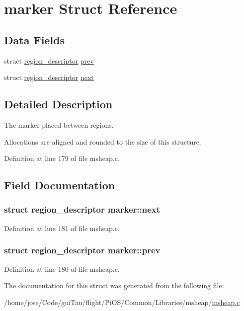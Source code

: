 \hypertarget{structmarker}{\section{marker Struct Reference}
\label{structmarker}
}
\subsection*{Data Fields}
\begin{DoxyCompactItemize}
\item 
struct \hyperlink{structregion__descriptor}{region\-\_\-descriptor} \hyperlink{structmarker_ade82c23737dc1d59fee5bbd897cfc5ed}{prev}
\item 
struct \hyperlink{structregion__descriptor}{region\-\_\-descriptor} \hyperlink{structmarker_a8a16cad707a0a821789eb685a6065b03}{next}
\end{DoxyCompactItemize}


\subsection{Detailed Description}
The marker placed between regions.

Allocations are aligned and rounded to the size of this structure. 

Definition at line 179 of file msheap.\-c.



\subsection{Field Documentation}
\hypertarget{structmarker_a8a16cad707a0a821789eb685a6065b03}{
\subsubsection[{next}]{\setlength{\rightskip}{0pt plus 5cm}struct {\bf region\-\_\-descriptor} marker\-::next}}\label{structmarker_a8a16cad707a0a821789eb685a6065b03}


Definition at line 181 of file msheap.\-c.

\hypertarget{structmarker_ade82c23737dc1d59fee5bbd897cfc5ed}{
\subsubsection[{prev}]{\setlength{\rightskip}{0pt plus 5cm}struct {\bf region\-\_\-descriptor} marker\-::prev}}\label{structmarker_ade82c23737dc1d59fee5bbd897cfc5ed}


Definition at line 180 of file msheap.\-c.



The documentation for this struct was generated from the following file\-:\begin{DoxyCompactItemize}
\item 
/home/jose/\-Code/gui\-Tau/flight/\-Pi\-O\-S/\-Common/\-Libraries/msheap/\hyperlink{msheap_8c}{msheap.\-c}\end{DoxyCompactItemize}

